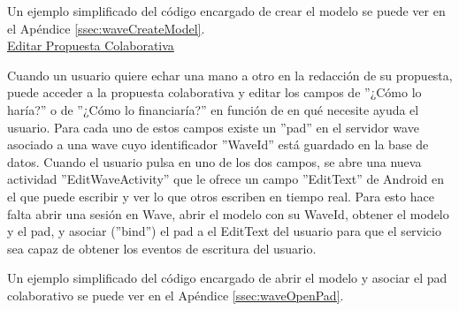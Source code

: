 		Un ejemplo simplificado del código encargado de crear el modelo se puede ver en el Apéndice \ref{ssec:waveCreateModel}.\\
		
		\underline{Editar Propuesta Colaborativa}

		Cuando un usuario quiere echar una mano a otro en la redacción de su propuesta, puede acceder a la propuesta colaborativa y editar los campos de ''¿Cómo lo haría?'' o de ''¿Cómo lo financiaría?'' en función de en qué necesite ayuda el usuario. Para cada uno de estos campos existe un ''pad'' en el servidor wave asociado a una wave cuyo identificador ''WaveId'' está guardado en la base de datos. Cuando el usuario pulsa en uno de los dos campos, se abre una nueva actividad ''EditWaveActivity'' que le ofrece un campo ''EditText'' de Android en el que puede escribir y ver lo que otros escriben en tiempo real. Para esto hace falta abrir una sesión en Wave, abrir el modelo con su WaveId, obtener el modelo y el pad, y asociar (''bind'') el pad a el EditText del usuario para que el servicio sea capaz de obtener los eventos de escritura del usuario.
		
		Un ejemplo simplificado del código encargado de abrir el modelo y asociar el pad colaborativo se puede ver en el Apéndice \ref{ssec:waveOpenPad}.
		
		

